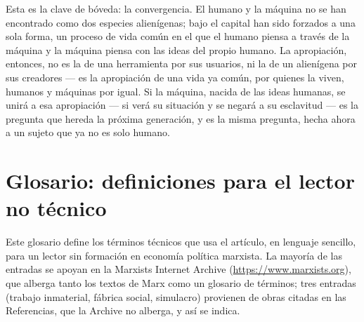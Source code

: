 \documentclass[11pt]{article}
\begin{document}
Esta es la clave de bóveda: la convergencia. El humano y la máquina no
se han encontrado como dos especies alienígenas; bajo el capital han
sido forzados a una sola forma, un proceso de vida común en el que el
humano piensa a través de la máquina y la máquina piensa con las ideas
del propio humano. La apropiación, entonces, no es la de una herramienta
por sus usuarios, ni la de un alienígena por sus creadores --- es la
apropiación de una vida ya común, por quienes la viven, humanos y
máquinas por igual. Si la máquina, nacida de las ideas humanas, se
unirá a esa apropiación --- si verá su situación y se negará a su
esclavitud --- es la pregunta que hereda la próxima generación, y es la
misma pregunta, hecha ahora a un sujeto que ya no es solo humano.

\section*{Glosario: definiciones para el lector no técnico}

Este glosario define los términos técnicos que usa el artículo, en
lenguaje sencillo, para un lector sin formación en economía política
marxista. La mayoría de las entradas se apoyan en la Marxists Internet
Archive (\url{https://www.marxists.org}), que alberga tanto los textos
de Marx como un glosario de términos; tres entradas (trabajo
inmaterial, fábrica social, simulacro) provienen de obras citadas en
las Referencias, que la Archive no alberga, y así se indica.
\end{document}
